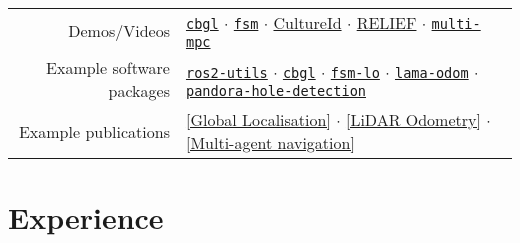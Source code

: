 \documentclass[a4paper,10pt,twoside]{article}
\newcommand{\verticalspacebetweensections}{\vspace{0.4em}}
\newcommand{\verticalspacebetweensectionandcontent}{\vspace{0.4em}}
\begin{document}
\vspace{0em}
\begin{tabular}{rl}

  Demos/Videos &
  \href{https://www.youtube.com/watch?v=xaDKjI0WkDc}{\texttt{cbgl}} $\cdot$
  \href{https://www.youtube.com/watch?v=hB4qsHCEXGI}{\texttt{fsm}} $\cdot$
  \href{https://cultureid.web.auth.gr/?page\_id=200&lang=en}{CultureId} $\cdot$
  \href{https://relief.web.auth.gr/}{RELIEF} $\cdot$
  \href{https://www.youtube.com/watch?v=937OZez1iN8}{\texttt{multi-mpc}} \\

  Example software packages &
  \href{https://github.com/li9i/ros2-utils}{\texttt{ros2-utils}} $\cdot$
  \href{https://github.com/li9i/cbgl}{\texttt{cbgl}} $\cdot$
  \href{https://github.com/li9i/fsm-lo}{\texttt{fsm-lo}} $\cdot$
  \href{https://github.com/li9i/lama-odom}{\texttt{lama-odom}} $\cdot$
  \href{https://github.com/li9i/pandora\_vision\_2014/tree/hydro-devel/pandora\_vision\_hole\_detector}{\texttt{pandora-hole-detection}} \\

  Example publications &
  \href{https://ieeexplore.ieee.org/abstract/document/10802235}{[Global Localisation]} $\cdot$
  \href{https://ieeexplore.ieee.org/abstract/document/9981228}{[LiDAR Odometry]} $\cdot$
  \href{https://www.tandfonline.com/doi/full/10.1080/00207179.2018.1514129}{[Multi-agent navigation]}
\end{tabular}
\verticalspacebetweensections

\section{\textbf{Experience}}\verticalspacebetweensectionandcontent
\end{document}
